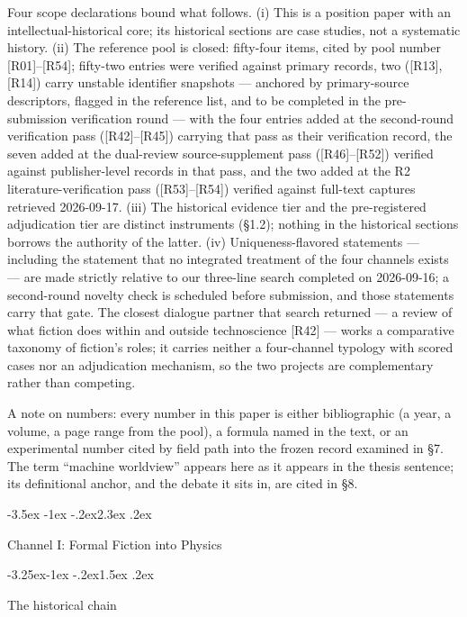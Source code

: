 \documentclass[11pt,a4paper]{article}
\makeatletter
\renewcommand\section{\@startsection{section}{1}{\z@}%
  {-3.5ex \@plus -1ex \@minus -.2ex}{2.3ex \@plus .2ex}%
  {\normalfont\Large\bfseries\raggedright}}
\renewcommand\subsection{\@startsection{subsection}{2}{\z@}%
  {-3.25ex\@plus -1ex \@minus -.2ex}{1.5ex \@plus .2ex}%
  {\normalfont\large\bfseries\raggedright}}
\makeatother
\begin{document}
Four scope declarations bound what follows. (i) This is a position paper with an intellectual-historical core; its historical sections are case studies, not a systematic history. (ii) The reference pool is closed: fifty-four items, cited by pool number [R01]–[R54]; fifty-two entries were verified against primary records, two ([R13], [R14]) carry unstable identifier snapshots — anchored by primary-source descriptors, flagged in the reference list, and to be completed in the pre-submission verification round — with the four entries added at the second-round verification pass ([R42]–[R45]) carrying that pass as their verification record, the seven added at the dual-review source-supplement pass ([R46]–[R52]) verified against publisher-level records in that pass, and the two added at the R2 literature-verification pass ([R53]–[R54]) verified against full-text captures retrieved 2026-09-17. (iii) The historical evidence tier and the pre-registered adjudication tier are distinct instruments (§1.2); nothing in the historical sections borrows the authority of the latter. (iv) Uniqueness-flavored statements — including the statement that no integrated treatment of the four channels exists — are made strictly relative to our three-line search completed on 2026-09-16; a second-round novelty check is scheduled before submission, and those statements carry that gate. The closest dialogue partner that search returned — a review of what fiction does within and outside technoscience [R42] — works a comparative taxonomy of fiction's roles; it carries neither a four-channel typology with scored cases nor an adjudication mechanism, so the two projects are complementary rather than competing.

A note on numbers: every number in this paper is either bibliographic (a year, a volume, a page range from the pool), a formula named in the text, or an experimental number cited by field path into the frozen record examined in §7. The term ``machine worldview'' appears here as it appears in the thesis sentence; its definitional anchor, and the debate it sits in, are cited in §8.

\section{Channel I: Formal Fiction into Physics}

\subsection{The historical chain}
\end{document}
